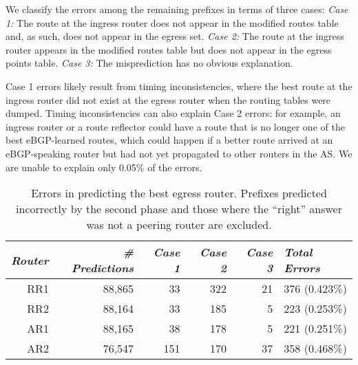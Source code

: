 We classify the
errors among the remaining prefixes in terms of three cases:
{\em Case 1:} The route at the ingress router does not appear in
  the {\dfc modified routes} table and, as such, does not appear in the
  egress set. 
{\em Case 2:} The route at the ingress router appears in the
  {\dfc modified routes} table but does not appear in the {\dfc egress
    points} table.  
{\em Case 3:} The misprediction has no obvious explanation.

Case 1 errors likely result from timing inconsistencies, where the best
route at the ingress router did not exist at the egress router when the
routing tables were dumped.  Timing inconsistencies can also explain
Case 2 errors: for example, an ingress router or a route reflector could
have a route that is no longer one of the best eBGP-learned routes, which
could happen if a better route arrived at an eBGP-speaking router but
had not yet propagated to other routers in the AS.  We are unable to
explain only 0.05\% of the errors.

\begin{table}
\begin{center}
{\small
\begin{tabular}{r|r|rrr|l}
{\em Router} & {\em \# Predictions}
& {\em Case 1} & {\em Case 2}
& {\em Case 3} & {\em Total Errors} \\ \hline 

RR1 &   88,865&  33&  322& 21 &  376 (0.423\%)   \\ %
RR2 &   88,164&  33&  185&  5 &  223 (0.253\%)   \\ %
AR1 &   88,165&  38&  178&  5 &  221 (0.251\%)    \\ %
AR2 &   76,547& 151&  170& 37 &  358 (0.468\%)   \\ %
\end{tabular}
\vspace{-0.15in}
}
\end{center}
\caption{Errors in predicting the best egress router.
  Prefixes predicted incorrectly by the second phase and those where
  the ``right'' answer was not a peering router are excluded.
} 
\label{tab:predictions_summary}
\end{table}

